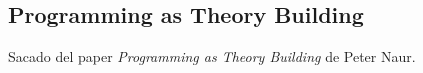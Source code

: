\subsection{Programming as Theory Building}

Sacado del paper \emph{Programming as Theory Building} de Peter Naur. 